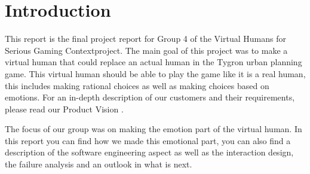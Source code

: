 \section{Introduction}
This report is the final project report for Group 4 of the Virtual Humans for Serious Gaming Contextproject. The main goal of this project was to make a virtual human that could replace an actual human in the Tygron \citep{tygron} urban planning game. This virtual human should be able to play the game like it is a real human, this includes making rational choices as well as making choices based on emotions. For an in-depth description of our customers and their requirements, please read our Product Vision \citep{vision}. \\ \par
The focus of our group was on making the emotion part of the virtual human. In this report you can find how we made this emotional part, you can also find a description of the software engineering aspect as well as the interaction design, the failure analysis and an outlook in what is next.